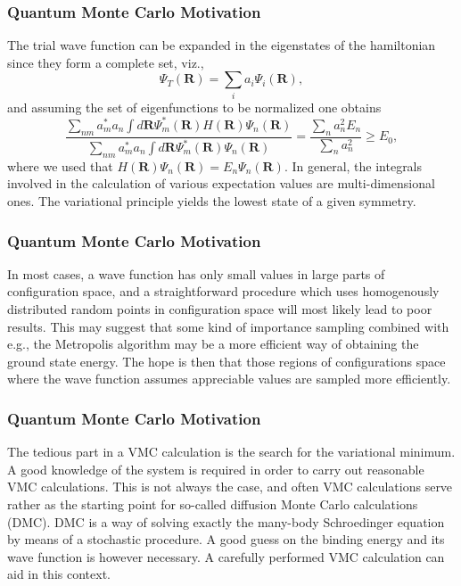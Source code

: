 \documentclass{beamer}
\begin{document}
\begin{frame}
\frametitle{Quantum Monte Carlo Motivation}

\begin{block}{}
The trial wave function can be expanded in the eigenstates of the hamiltonian since they form a complete set, viz.,
\[
   \Psi_T(\bm{R})=\sum_i a_i\Psi_i(\bm{R}),
\]
and assuming the set of eigenfunctions to be normalized one obtains 
\[
     \frac{\sum_{nm}a^*_ma_n \int d\bm{R}\Psi^{\ast}_m(\bm{R})H(\bm{R})\Psi_n(\bm{R})}
        {\sum_{nm}a^*_ma_n \int d\bm{R}\Psi^{\ast}_m(\bm{R})\Psi_n(\bm{R})} =\frac{\sum_{n}a^2_n E_n}
        {\sum_{n}a^2_n} \ge E_0,
\]
where we used that $H(\bm{R})\Psi_n(\bm{R})=E_n\Psi_n(\bm{R})$.
In general, the integrals involved in the calculation of various  expectation
values  are multi-dimensional ones. 
The variational principle yields the lowest state of a given symmetry.

\end{block}
\end{frame}

\begin{frame}
\frametitle{Quantum Monte Carlo Motivation}

\begin{block}{}
In most cases, a wave function has only small values in large parts of 
configuration space, and a straightforward procedure which uses
homogenously distributed random points in configuration space 
will most likely lead to poor results. This may suggest that some kind
of importance sampling combined with e.g., the Metropolis algorithm 
may be  a more efficient way of obtaining the ground state energy.
The hope is then that those regions of configurations space where
the wave function assumes appreciable values are sampled more 
efficiently. 
\end{block}
\end{frame}

\begin{frame}
\frametitle{Quantum Monte Carlo Motivation}

\begin{block}{}
The tedious part in a VMC calculation is the search for the variational
minimum. A good knowledge of the system is required in order to carry out
reasonable VMC calculations. This is not always the case, 
and often VMC calculations 
serve rather as the starting
point for so-called diffusion Monte Carlo calculations (DMC). DMC is a way of
solving exactly the many-body Schroedinger equation by means of 
a stochastic procedure. A good guess on the binding energy
and its wave function is however necessary. 
A carefully performed VMC calculation can aid in this context. 
\end{block}
\end{frame}
\end{document}

